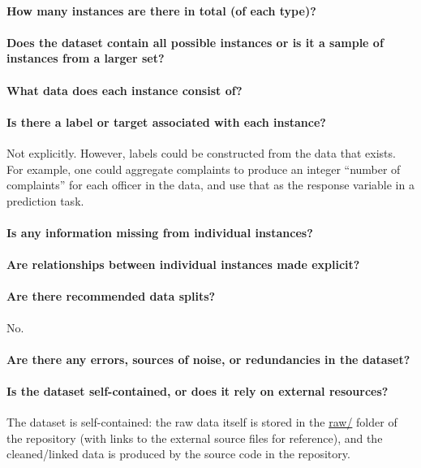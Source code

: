 \paragraph{How many instances are there in total (of each type)?}

\paragraph{Does the dataset contain all possible instances or is it a sample of instances from a larger set?}

\paragraph{What data does each instance consist of?}

\paragraph{Is there a label or target associated with each instance?}
Not explicitly. However, labels could be constructed from the data 
that exists. For example, one could aggregate complaints to produce
an integer ``number of complaints'' for each officer in the data,
and use that as the response variable in a prediction task.

\paragraph{Is any information missing from individual instances?}

\paragraph{Are relationships between individual instances made explicit?}

\paragraph{Are there recommended data splits?}
No.

\paragraph{Are there any errors, sources of noise, or redundancies in the dataset?}

\paragraph{Is the dataset self-contained, or does it rely on external resources?}
The dataset is self-contained: the raw data itself is stored in the \url{raw/} folder of the repository 
(with links to the external source files for reference), 
and the cleaned/linked data is produced by the source code in the repository.

